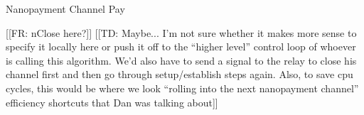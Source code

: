 \documentclass{article}
\newcommand{\flo}[1]{ {\color{blue} [[FR: #1]]}}
\newcommand{\thi}[1]{ {\color{red} [[TD: #1]]}}
\begin{document}
\begin{algorithm}
  \caption{Nanopayment Channel Pay}
  \begin{algorithmic}[1]


        \flo{nClose here?}
        \thi{Maybe... I'm not sure whether it makes more sense to specify it locally here or push it off to the ``higher level'' control loop of whoever is calling this algorithm. We'd also have to send a signal to the relay to close his channel first and then go through setup/establish steps again. Also, to save cpu cycles, this would be where we look ``rolling into the next nanopayment channel'' efficiency shortcuts that Dan was talking about}
      \EndIf{}

    \EndProcedure{}

      \EndIf{}
    \EndProcedure{}
  \end{algorithmic}
\end{algorithm}
\end{document}
